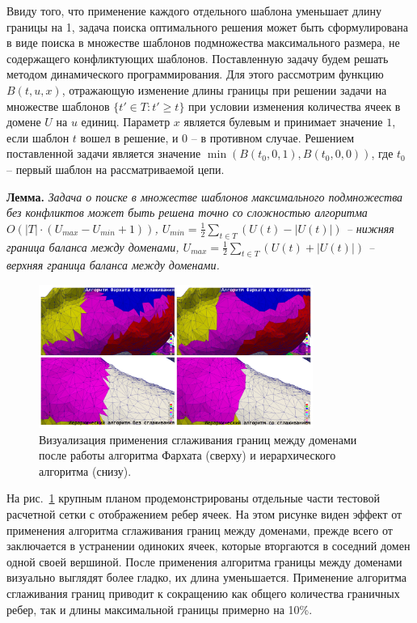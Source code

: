 \documentclass[a4paper,14pt]{extarticle}                     %
\theoremstyle{plain}                                         %
\begin{document}
Ввиду того, что применение каждого отдельного шаблона уменьшает длину границы на 1, задача поиска оптимального решения может быть сформулирована в виде поиска в множестве шаблонов подмножества максимального размера, не содержащего конфликтующих шаблонов.
Поставленную задачу будем решать методом динамического программирования.
Для этого рассмотрим функцию $B(t, u, x)$, отражающую изменение длины границы при решении задачи на множестве шаблонов $\{ t' \in T : t' \ge t \}$ при условии изменения количества ячеек в домене $U$ на $u$ единиц.
Параметр $x$ является булевым и принимает значение $1$, если шаблон $t$ вошел в решение, и $0$ -- в противном случае.
Решением поставленной задачи является значение $\min(B(t_0, 0, 1), B(t_0, 0, 0))$, где $t_0$ -- первый шаблон на рассматриваемой цепи.

\textbf{Лемма.} \textit{Задача о поиске в множестве шаблонов максимального подмножества без конфликтов может быть решена точно со сложностью алгоритма $O \left( |T| \cdot (U_{max} - U_{min} + 1) \right)$, $U_{min} = \frac{1}{2} \sum_{t \in T}{(U(t) - |U(t)|)}$ -- нижняя граница баланса между доменами, $U_{max} = \frac{1}{2} \sum_{t \in T}{(U(t) + |U(t)|)}$ -- верхняя граница баланса между доменами.}

\begin{figure}[!ht]
\centering
\includegraphics[width=0.8\textwidth]{./pics/text_2_smooth/decomp2.pdf}
\singlespacing
\caption{Визуализация применения сглаживания границ между доменами после работы алгоритма Фархата (сверху) и иерархического алгоритма (снизу).}
\label{fig:text_2_smooth_decomp2}
\end{figure}

На рис.~\ref{fig:text_2_smooth_decomp2} крупным планом продемонстрированы отдельные части тестовой расчетной сетки с отображением ребер ячеек.
На этом рисунке виден эффект от применения алгоритма сглаживания границ между доменами, прежде всего от заключается в устранении одиноких ячеек, которые вторгаются в соседний домен одной своей вершиной.
После применения алгоритма границы между доменами визуально выглядят более гладко, их длина уменьшается.
Применение алгоритма сглаживания границ приводит к сокращению как общего количества граничных ребер, так и длины максимальной границы примерно на 10\%.
\end{document}
